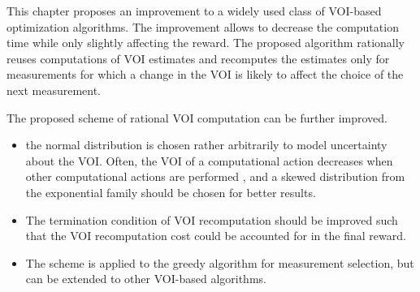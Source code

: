 This chapter proposes an improvement to a widely used class of VOI-based
optimization algorithms. The improvement allows to decrease the
computation time while only slightly affecting the reward. The
proposed algorithm rationally reuses computations of VOI estimates and
recomputes the estimates only for measurements for which a change in
the VOI is likely to affect the choice of the next
measurement.

The proposed scheme of rational VOI computation can be further
improved. 
\begin{itemize}
\item  the normal distribution is chosen rather arbitrarily to model
  uncertainty about the VOI. Often, the VOI of a
  computational action decreases when other computational actions are  
  performed \cite{Guestrin.submodular}, and a skewed distribution from the
  exponential family should be chosen for better results.
\item The termination condition of VOI recomputation should be
  improved such that the VOI recomputation cost could be accounted for
  in the final reward.
\item The scheme is applied to the greedy algorithm
  for measurement selection, but can be extended to other
  VOI-based algorithms.
\end{itemize}
